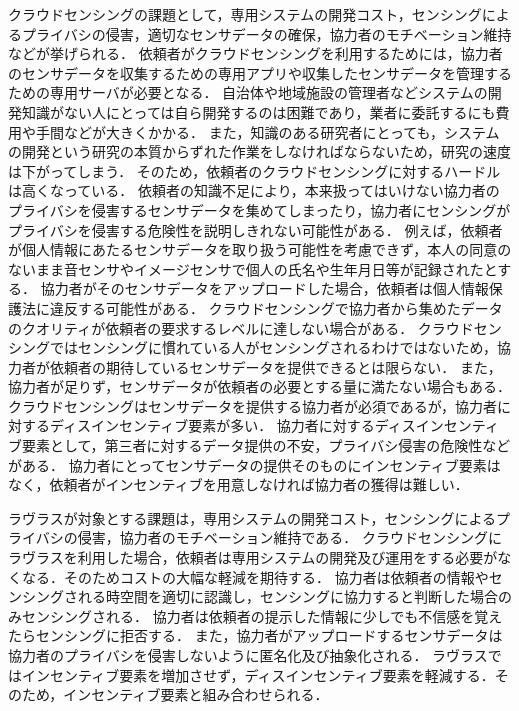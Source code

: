 クラウドセンシングの課題として，専用システムの開発コスト，センシングによるプライバシの侵害，適切なセンサデータの確保，協力者のモチベーション維持などが挙げられる．
依頼者がクラウドセンシングを利用するためには，協力者のセンサデータを収集するための専用アプリや収集したセンサデータを管理するための専用サーバが必要となる．
自治体や地域施設の管理者などシステムの開発知識がない人にとっては自ら開発するのは困難であり，業者に委託するにも費用や手間などが大きくかかる．
また，知識のある研究者にとっても，システムの開発という研究の本質からずれた作業をしなければならないため，研究の速度は下がってしまう．
そのため，依頼者のクラウドセンシングに対するハードルは高くなっている．
依頼者の知識不足により，本来扱ってはいけない協力者のプライバシを侵害するセンサデータを集めてしまったり，協力者にセンシングがプライバシを侵害する危険性を説明しきれない可能性がある．
例えば，依頼者が個人情報にあたるセンサデータを取り扱う可能性を考慮できず，本人の同意のないまま音センサやイメージセンサで個人の氏名や生年月日等が記録されたとする．
協力者がそのセンサデータをアップロードした場合，依頼者は個人情報保護法に違反する可能性がある．
クラウドセンシングで協力者から集めたデータのクオリティが依頼者の要求するレベルに達しない場合がある．
クラウドセンシングではセンシングに慣れている人がセンシングされるわけではないため，協力者が依頼者の期待しているセンサデータを提供できるとは限らない．
また，協力者が足りず，センサデータが依頼者の必要とする量に満たない場合もある．
クラウドセンシングはセンサデータを提供する協力者が必須であるが，協力者に対するディスインセンティブ要素が多い．
協力者に対するディスインセンティブ要素として，第三者に対するデータ提供の不安，プライバシ侵害の危険性などがある．
協力者にとってセンサデータの提供そのものにインセンティブ要素はなく，依頼者がインセンティブを用意しなければ協力者の獲得は難しい．

ラヴラスが対象とする課題は，専用システムの開発コスト，センシングによるプライバシの侵害，協力者のモチベーション維持である．
クラウドセンシングにラヴラスを利用した場合，依頼者は専用システムの開発及び運用をする必要がなくなる．そのためコストの大幅な軽減を期待する．
協力者は依頼者の情報やセンシングされる時空間を適切に認識し，センシングに協力すると判断した場合のみセンシングされる．
協力者は依頼者の提示した情報に少しでも不信感を覚えたらセンシングに拒否する．
また，協力者がアップロードするセンサデータは協力者のプライバシを侵害しないように匿名化及び抽象化される．
ラヴラスではインセンティブ要素を増加させず，ディスインセンティブ要素を軽減する．そのため，インセンティブ要素と組み合わせられる．




